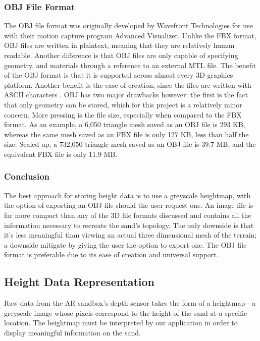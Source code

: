 \subsubsection{OBJ File Format}
The OBJ file format was originally developed by Wavefront Technologies for use with their motion capture program Advanced Visualizer. Unlike the FBX format, OBJ files are written in plaintext, meaning that they are relatively human readable.  Another difference is that OBJ files are only capable of specifying geometry, and materials through a reference to an external MTL file. The benefit of the OBJ format is that it is supported across almost every 3D graphics platform. Another benefit is the ease of creation, since the files are written with ASCII characters . OBJ has two major drawbacks however: the first is the fact that only geometry can be stored, which for this project is a relatively minor concern. More pressing is the file size, especially when compared to the FBX format. As an example, a 6,050 triangle mesh saved as an OBJ file is 293 KB, whereas the same mesh saved as an FBX file is only 127 KB, less than half the size. Scaled up, a 732,050 triangle mesh saved as an OBJ file is 39.7 MB, and the equivalent FBX file is only 11.9 MB. 

\subsubsection{Conclusion}
The best approach for storing height data is to use a greyscale heightmap, with the option of exporting an OBJ file should the user request one. An image file is far more compact than any of the 3D file formats discussed and contains all the information necessary to recreate the sand's topology. The only downside is that it's less meaningful than viewing an actual three dimensional mesh of the terrain; a downside mitigate by giving the user the option to export one. The OBJ file format is preferable due to its ease of creation and universal support.

\subsection{Height Data Representation}
Raw data from the AR sandbox's depth sensor takes the form of a heightmap - a greyscale image whose pixels correspond to the height of the sand at a specific location. The heightmap must be interpreted by our application in order to display meaningful information on the sand. 

